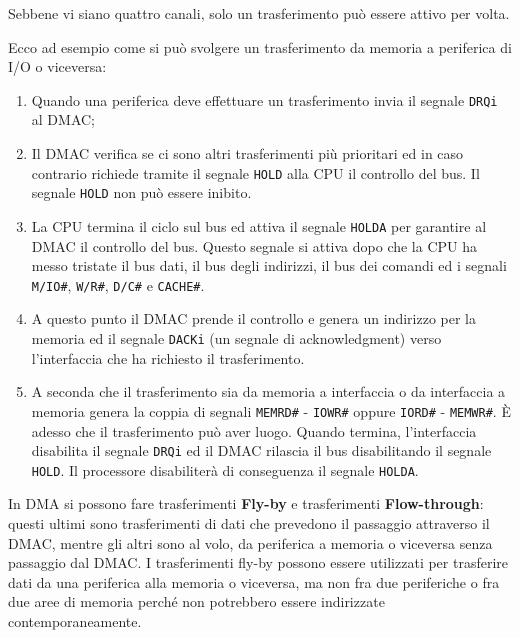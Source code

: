 \documentclass[11pt]{book}
\begin{document}
Sebbene vi siano quattro canali, solo un trasferimento pu\`o essere
attivo per volta.

Ecco ad esempio come si pu\`o svolgere un trasferimento da memoria a
periferica di I/O o viceversa: 

\begin{enumerate}
\item Quando una periferica deve effettuare un trasferimento invia il
  segnale \texttt{DRQi} al DMAC;

\item Il DMAC verifica se ci sono altri trasferimenti pi\`u prioritari
  ed in caso contrario richiede tramite il segnale \texttt{HOLD} alla
  CPU il controllo del bus. Il segnale \texttt{HOLD} non pu\`o essere inibito.

\item La CPU termina il ciclo sul bus ed attiva il segnale
  \texttt{HOLDA} per garantire al DMAC il controllo del bus. Questo
  segnale si attiva dopo che la CPU ha messo tristate il bus dati, il
  bus degli indirizzi, il bus dei comandi ed i segnali
  \texttt{M/IO\#}, \texttt{W/R\#}, \texttt{D/C\#} e \texttt{CACHE\#}.

\item A questo punto il DMAC prende il controllo e genera un indirizzo
  per la memoria ed il segnale \texttt{DACKi} (un segnale di
  acknowledgment) verso l'interfaccia che ha richiesto il
  trasferimento.

\item A seconda che il trasferimento sia da memoria a interfaccia o da
  interfaccia a memoria genera la coppia di segnali \texttt{MEMRD\#} -
  \texttt{IOWR\#} oppure \texttt{IORD\#} - \texttt{MEMWR\#}. \`E
  adesso che il trasferimento pu\`o aver luogo. Quando termina,
  l'interfaccia disabilita il segnale \texttt{DRQi} ed il DMAC
  rilascia il bus disabilitando il segnale \texttt{HOLD}. Il
  processore disabiliter\`a di conseguenza il segnale \texttt{HOLDA}.

\end{enumerate}

In DMA si possono fare trasferimenti \textbf{Fly-by} e trasferimenti
\textbf{Flow-through}: questi ultimi sono trasferimenti di dati che
prevedono il passaggio attraverso il DMAC, mentre gli altri sono al
volo, da periferica a memoria o viceversa senza passaggio dal DMAC. I
trasferimenti fly-by possono essere utilizzati per trasferire dati da
una periferica alla memoria o viceversa, ma non fra due periferiche o
fra due aree di memoria perch\'e non potrebbero essere indirizzate
contemporaneamente.
\end{document}
